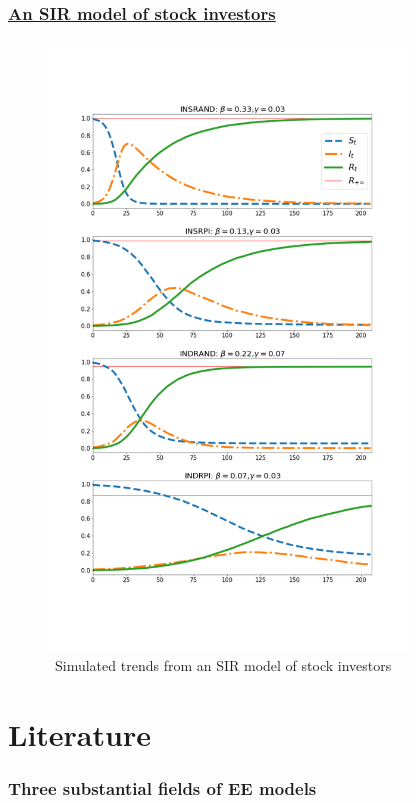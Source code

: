 \documentclass[pdflatex]{beamer}
\begin{document}
\begin{frame}
		\frametitle{\href{https://mybinder.org/v2/gh/llorracc/EpiExp/HEAD?filepath=SIR_Ndlib.ipynb}{An SIR model of stock investors} }
		\begin{figure}[!ht] \centering  %
			\caption{ ~Simulated trends from an SIR model of stock investors}
			\label{fig:sir_simulate}
			\includegraphics[width=0.85\textwidth]{./figures/sir_simulate}
		\end{figure}
\end{frame}

\section{Literature}\label{survey-of-the-literature}


\begin{frame}
	\frametitle{Three substantial fields of EE models}

\end{frame}
\end{document}
